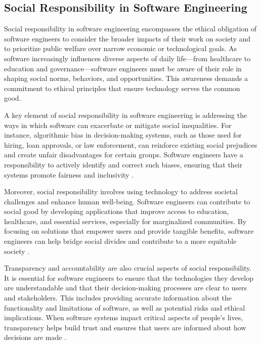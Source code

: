 \begin{refsection}
\subsection{Social Responsibility in Software Engineering}

Social responsibility in software engineering encompasses the ethical obligation of software engineers to consider the broader impacts of their work on society and to prioritize public welfare over narrow economic or technological goals. As software increasingly influences diverse aspects of daily life—from healthcare to education and governance—software engineers must be aware of their role in shaping social norms, behaviors, and opportunities. This awareness demands a commitment to ethical principles that ensure technology serves the common good.

A key element of social responsibility in software engineering is addressing the ways in which software can exacerbate or mitigate social inequalities. For instance, algorithmic bias in decision-making systems, such as those used for hiring, loan approvals, or law enforcement, can reinforce existing social prejudices and create unfair disadvantages for certain groups. Software engineers have a responsibility to actively identify and correct such biases, ensuring that their systems promote fairness and inclusivity \cite[pp.~85-88]{noble2018algorithms}.

Moreover, social responsibility involves using technology to address societal challenges and enhance human well-being. Software engineers can contribute to social good by developing applications that improve access to education, healthcare, and essential services, especially for marginalized communities. By focusing on solutions that empower users and provide tangible benefits, software engineers can help bridge social divides and contribute to a more equitable society \cite[pp.~59-61]{toyama2015geek}.

Transparency and accountability are also crucial aspects of social responsibility. It is essential for software engineers to ensure that the technologies they develop are understandable and that their decision-making processes are clear to users and stakeholders. This includes providing accurate information about the functionality and limitations of software, as well as potential risks and ethical implications. When software systems impact critical aspects of people's lives, transparency helps build trust and ensures that users are informed about how decisions are made \cite[pp.~114-117]{dijck2013culture}.


\end{refsection}
